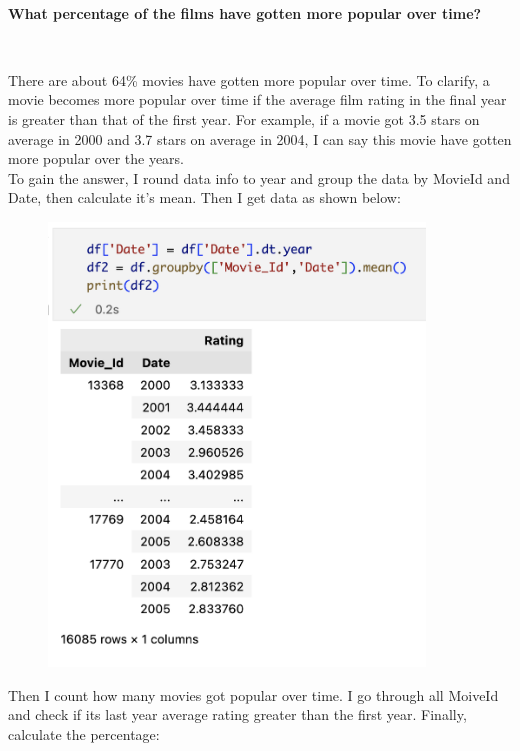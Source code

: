 \documentclass{article}
\begin{document}
\begin{enumerate}
\\
{
\linespread{2.0} \selectfont
\item \textbf {What percentage of the films have gotten more popular over time?}
}
\\
{
\linespread{1.3}\selectfont
There are about 64\% movies have gotten more popular over time. To clarify, a movie becomes more popular over time if the average film rating in the final year is greater than that of the first year. For example, if a movie got 3.5 stars on average in 2000 and 3.7 stars on average in 2004, I can say this movie have gotten more popular over the years. 
\\ To gain the answer, I round data info to year and group the data by MovieId and Date, then calculate it's mean. Then I get data as shown below:
\begin{figure}[H]
\centering
\includegraphics[width = 10cm]{images/group.png}
\end{figure}
\noindent Then I count how many movies got popular over time. I go through all MoiveId and check if its last year average rating greater than the first year. Finally, calculate the percentage:
\begin{figure}[H]
\centering

\end{figure}}
\end{enumerate}
\end{document}
